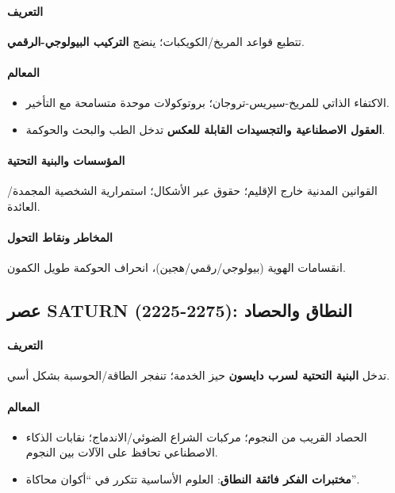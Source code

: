 \documentclass[11pt]{article}
\begin{document}
\paragraph{التعريف} تتطبع قواعد المريخ/الكويكبات؛ ينضج \textbf{التركيب البيولوجي-الرقمي}.

\paragraph{المعالم}
\begin{itemize}[noitemsep]
  \item الاكتفاء الذاتي للمريخ-سيريس-تروجان؛ بروتوكولات موحدة متسامحة مع التأخير.
  \item \textbf{العقول الاصطناعية والتجسيدات القابلة للعكس} تدخل الطب والبحث والحوكمة.
\end{itemize}

\paragraph{المؤسسات والبنية التحتية} القوانين المدنية خارج الإقليم؛ حقوق عبر الأشكال؛ استمرارية الشخصية المجمدة/العائدة.

\paragraph{المخاطر ونقاط التحول} انقسامات الهوية (بيولوجي/رقمي/هجين)، انحراف الحوكمة طويل الكمون.

\subsection{عصر SATURN (2225-2275): النطاق والحصاد}
\paragraph{التعريف} تدخل \textbf{البنية التحتية لسرب دايسون} حيز الخدمة؛ تنفجر الطاقة/الحوسبة بشكل أسي.

\paragraph{المعالم}
\begin{itemize}[noitemsep]
  \item الحصاد القريب من النجوم؛ مركبات الشراع الضوئي/الاندماج؛ نقابات الذكاء الاصطناعي تحافظ على الآلات بين النجوم.
  \item \textbf{مختبرات الفكر فائقة النطاق}: العلوم الأساسية تتكرر في ``أكوان محاكاة''.
\end{itemize}
\end{document}

